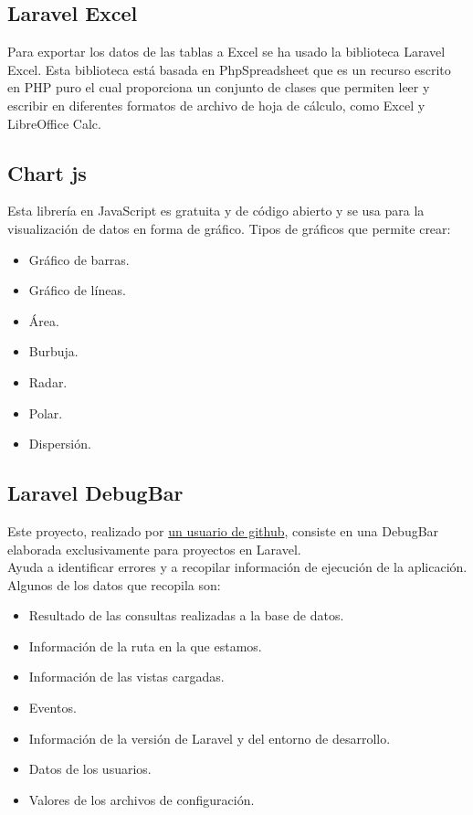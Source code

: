 \subsection{Laravel Excel}
Para exportar los datos de las tablas a Excel se ha usado la biblioteca Laravel Excel.
Esta biblioteca está basada en PhpSpreadsheet que es un recurso escrito en PHP puro el cual proporciona un conjunto de clases que permiten leer y escribir en diferentes formatos de archivo de hoja de cálculo, como Excel y LibreOffice Calc.\cite{LaravelExcel}\\

\subsection{Chart js}
Esta librería en JavaScript es gratuita y de código abierto y se usa para la visualización de datos en forma de gráfico.
Tipos de gráficos que permite crear:
\begin{itemize}
    \item Gráfico de barras.
    \item Gráfico de líneas.
    \item Área.
    \item Burbuja.
    \item Radar.
    \item Polar.
    \item Dispersión.
\end{itemize}
\subsection{Laravel DebugBar}
Este proyecto, realizado por \href{https://github.com/barryvdh}{un usuario de github}, consiste en una DebugBar elaborada exclusivamente para proyectos en Laravel.\\
Ayuda a identificar errores y a recopilar información de ejecución de la aplicación. Algunos de los datos que recopila son:
\begin{itemize}
    \item Resultado de las consultas realizadas a la base de datos.
    \item Información de la ruta en la que estamos.
    \item Información de las vistas cargadas.
    \item Eventos.
    \item Información de la versión de Laravel y del entorno de desarrollo.
    \item Datos de los usuarios.
    \item Valores de los archivos de configuración.
\end{itemize}
